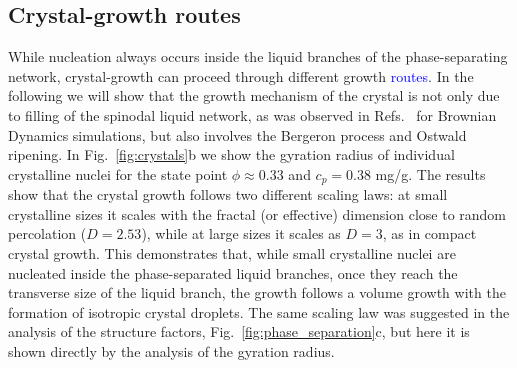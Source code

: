 \documentclass[preprint,amsmath,amssymb,superscriptaddress]{revtex4-1}
\begin{document}
\subsection{Crystal-growth routes}

While nucleation always occurs inside the liquid branches of the phase-separating network, crystal-growth can proceed through different growth \textcolor{blue}{routes}.
In the following we will show that the growth mechanism of the crystal is not only due to filling of the spinodal liquid network, as was observed in Refs.~\cite{soga1999metastable,fortini2008crystallization,perez2011pathways} for Brownian Dynamics simulations, but also involves the Bergeron process and Ostwald ripening. 
In Fig.~\ref{fig:crystals}b we show the gyration radius of individual crystalline nuclei for the state point 
$\phi\approx 0.33$ and $c_p=0.38$ mg/g. The results show that the crystal growth follows two different scaling laws: at small crystalline sizes it scales with 
the fractal (or effective) dimension close to random percolation ($D=2.53$), while at large sizes it scales as $D=3$, as in compact crystal growth. This demonstrates that, while 
small crystalline nuclei are nucleated inside the phase-separated liquid branches, once they reach the transverse size of the liquid branch, the growth 
follows a volume growth with the formation of isotropic crystal droplets. The same scaling law was suggested in the analysis of the
structure factors, Fig.~\ref{fig:phase_separation}c, but here it is shown directly by the analysis of the gyration radius. 
\end{document}
